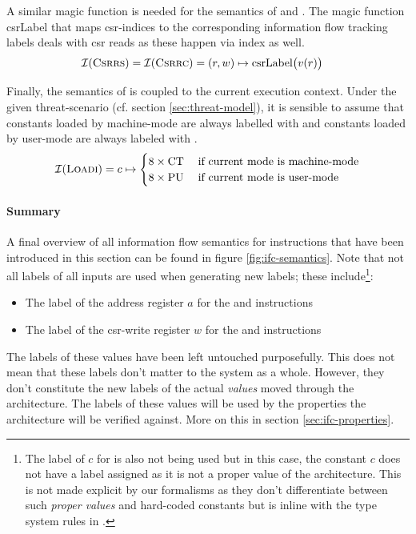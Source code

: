 A similar magic function is needed for the semantics of  and .
The magic function \mbox{csrLabel} that maps \gls{csr}-indices to the corresponding information flow tracking labels deals with \gls{csr} reads as these happen via index as well.
\begin{align*}
    \mathcal{I}(\textsc{Csrrs}) = \mathcal{I}(\textsc{Csrrc}) &= (r, w) \mapsto \text{csrLabel}\big(v(r) \big)
\end{align*}

Finally, the semantics of  is coupled to the current execution context.
Under the given threat-scenario (cf. section \ref{sec:threat-model}), it is sensible to assume that constants loaded by machine-mode are always labelled with \CT{} and constants loaded by user-mode are always labeled with \PU{}.
\begin{equation*}
    \mathcal{I}(\textsc{Loadi}) = c \mapsto \begin{cases}
        8 \times \text{CT} & \; \text{if current mode is machine-mode} \\
        8 \times \text{PU} & \; \text{if current mode is user-mode}
    \end{cases}
\end{equation*}

\paragraph{Summary}
A final overview of all information flow semantics for instructions that have been introduced in this section can be found in figure \ref{fig:ifc-semantics}.
Note that not all labels of all inputs are used when generating new labels; these include\footnote{%
    The label of $ c $ for  is also not being used but in this case, the constant $ c $ does not have a label assigned as it is not a proper value of the architecture.
    This is not made explicit by our formalisms as they don't differentiate between such \textit{proper values} and hard-coded constants but is inline with the type system rules in \cite{Ferraiuolo17}.
}:
\begin{itemize}
    \item The label of the address register $ a $ for the  and  instructions
    \item The label of the \gls{csr}-write register $ w $ for the  and  instructions
\end{itemize}

The labels of these values have been left untouched purposefully.
This does not mean that these labels don't matter to the system as a whole.
However, they don't constitute the new labels of the actual \textit{values} moved through the architecture.
The labels of these values will be used by the properties the architecture will be verified against.
More on this in section \ref{sec:ifc-properties}.

